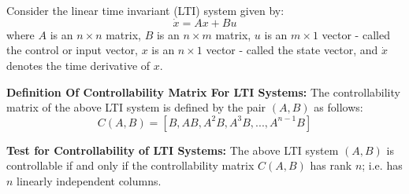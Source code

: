 \documentclass[12pt]{article}
\begin{document}
Consider the linear time invariant (LTI) system given by:
\[
                   \dot{x} = Ax + Bu
\]
where $A$ is an $n \times n$ matrix, $B$ is an $n \times m$ matrix, $u$ is an $m \times 1$ vector - called the control or input vector, $x$ is an $n
\times 1$ vector - called the state vector, and $\dot{x}$ denotes the time derivative of $x$.


{\bf Definition Of Controllability Matrix For LTI Systems:} The controllability matrix of the above LTI system is defined by the pair $(A,B)$ as follows:
\[
             C(A,B) = \left[ B , AB,  A^{2}B,  A^{3}B,..., A^{n-1}B \right]
\]

{\bf Test for Controllability of LTI Systems:} The above LTI system $(A,B)$ is controllable if and only if the controllability matrix $C(A,B)$ has rank $n$;
i.e. has $n$ linearly independent columns.
\end{document}
